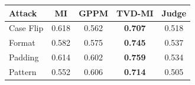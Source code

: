 \begin{center}
\begin{tabular}{lcccc}
\toprule
\textbf{Attack} & \textbf{MI} & \textbf{GPPM} & \textbf{TVD-MI} & \textbf{Judge} \\
\midrule
Case Flip & 0.618 & 0.562 & \textbf{0.707} & 0.518 \\
Format & 0.582 & 0.575 & \textbf{0.745} & 0.537 \\
Padding & 0.614 & 0.602 & \textbf{0.759} & 0.534 \\
Pattern & 0.552 & 0.606 & \textbf{0.714} & 0.505 \\
\bottomrule
\end{tabular}
\end{center}